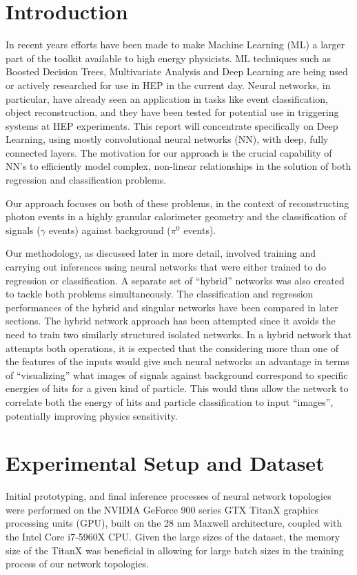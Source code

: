 \documentclass[twocolumn,aps,prd,reprint,superscriptaddress]{revtex4-1}
\newcommand{\q}[1]{``#1''}
\begin{document}
	\section{Introduction}
	In recent years efforts have been made to make Machine Learning (ML) a larger part of the toolkit available to high energy physicists. ML techniques such as Boosted Decision Trees, Multivariate Analysis and Deep Learning are being used or actively researched for use in HEP in the current day. Neural networks, in particular, have already seen an application in tasks like event classification, object reconstruction, and they have been tested for potential use in triggering systems at HEP experiments. This report will concentrate specifically on Deep Learning, using mostly convolutional neural networks (NN), with deep, fully connected layers. The motivation for our approach is the crucial capability of NN's to efficiently model complex, non-linear relationships in the solution of both regression and classification problems.\par
	Our approach focuses on both of these problems, in the context of reconstructing photon events in a highly granular calorimeter geometry and the classification of signals ($\gamma$ events) against background ($\pi^{0}$ events). \par 
	
	Our methodology, as discussed later in more detail, involved training and carrying out inferences using neural networks that were either trained to do regression or classification. A separate set of \q{hybrid} networks was also created to tackle both problems simultaneously. The classification and regression performances of the hybrid and singular networks have been compared in later sections. The hybrid network approach has been attempted since it avoids the need to train two similarly structured isolated networks. In a hybrid network that attempts both operations, it is expected that the considering more than one of the features of the inputs would give such neural networks an advantage in terms of \q{visualizing} what images of signals against background correspond to specific energies of hits for a given kind of particle. This would thus allow the network to correlate both the energy of hits and particle classification to input \q{images}, potentially improving physics sensitivity. \par
	
	
	
		 
	\section{Experimental Setup and Dataset}
	Initial prototyping, and final inference processes of neural network topologies were performed on the NVIDIA GeForce 900 series GTX TitanX graphics processing units (GPU), built on the 28 nm Maxwell architecture, coupled with the Intel Core i7-5960X CPU. Given the large sizes of the dataset, the memory size of the TitanX was beneficial in allowing for large batch sizes in the training process of our network topologies.
	
\end{document}
